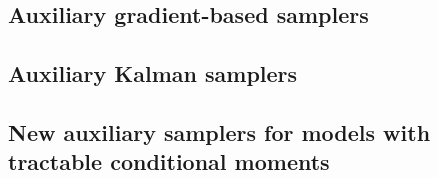 

\subsection{Auxiliary gradient-based samplers}
\label{subsec:auxiliary-general}


\subsection{Auxiliary Kalman samplers}\label{subsec:auxiliary-lgssm}


\subsection{New auxiliary samplers for models with tractable conditional moments}
\label{subsec:auxiliary-ssm-sampler}

